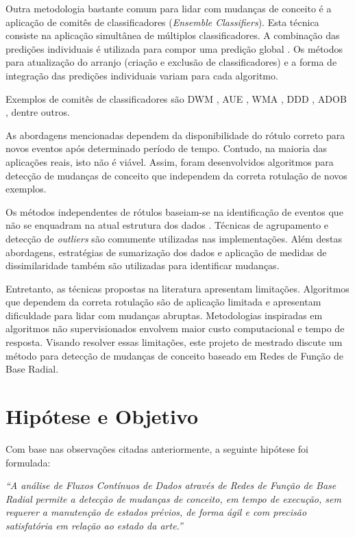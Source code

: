 \documentclass[qual, classic, a4paper]{ufbathesis}
\begin{document}
Outra metodologia bastante comum para lidar com mudanças de conceito é a aplicação de comitês de classificadores (\textit{Ensemble Classifiers}). 
Esta técnica consiste na aplicação simultânea de múltiplos classificadores.
A combinação das predições individuais é utilizada para compor uma predição global \cite{Gama:2014:SCD:2597757.2523813}.
Os métodos para atualização do arranjo (criação e exclusão de classificadores) e a forma de integração das predições individuais variam para cada algoritmo.

Exemplos de comitês de classificadores são 
DWM \cite{Kolter:2007:DWM:1314498.1390333}, AUE \cite{AUE}, 
WMA \cite{Blum1997}, DDD \cite{Minku:2012:DNE:2197077.2197204}, ADOB \cite{deCarvalhoSantos:2014:SUR:3120352.3120365}, dentre outros.

As abordagens mencionadas dependem da disponibilidade do rótulo correto para novos eventos após determinado período de tempo.
Contudo, na maioria das aplicações reais, isto não é viável. 
Assim, foram desenvolvidos algoritmos para detecção de mudanças de conceito que independem da correta rotulação de novos exemplos.

Os métodos independentes de rótulos baseiam-se na identificação de eventos que não se enquadram na atual estrutura dos dados \cite{Spinosa:2007:OCA:1244002.1244107}.
Técnicas de agrupamento e detecção de \textit{outliers} são comumente utilizadas nas implementações.
Além destas abordagens, estratégias de sumarização dos dados e aplicação de medidas de dissimilaridade \cite{Ryu:Kantardzic:2012} também são utilizadas para identificar mudanças.

Entretanto, as técnicas propostas na literatura apresentam limitações.
Algoritmos que dependem da correta rotulação são de aplicação limitada e apresentam dificuldade para lidar com mudanças abruptas.
Metodologias inspiradas em algoritmos não supervisionados envolvem maior custo computacional e tempo de resposta.
Visando resolver essas limitações, este projeto de mestrado discute um método para detecção de mudanças de conceito baseado em Redes de Função de Base Radial.

\section{Hipótese e Objetivo}

Com base nas observações citadas anteriormente, a seguinte hipótese foi formulada:

\begin{center}
\textit{``A análise de Fluxos Contínuos de Dados através de Redes de Função de Base Radial permite a detecção de mudanças de conceito, 
em tempo de execução, sem requerer a manutenção de estados prévios, de forma ágil e com precisão satisfatória em relação ao estado da arte.''}
\end{center}
\end{document}
